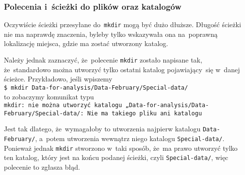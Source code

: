 \documentclass[10pt,t]{beamer}
\begin{document}
\begin{frame}
  \frametitle{Polecenia i~ścieżki do plików oraz katalogów}


  Oczywiście ścieżki przesyłane do~\texttt{mkdir} mogą być dużo dłuższe.
  Długość ścieżki nie ma naprawdę znaczenia, byleby tylko wskazywała ona
  na~poprawną lokalizację miejsca, gdzie ma zostać utworzony katalog.

  Należy jednak zaznaczyć, że~polecenie \texttt{mkdir} zostało napisane tak,
  że~standardowo można utworzyć tylko ostatni katalog pojawiający~się
  w~danej ścieżce. Przykładowo, jeśli wpiszemy \\
  \texttt{\$ mkdir Data-for-analysis/Data-February/Special-data/} \\
  to zobaczymy komunikat typu \\
  \texttt{mkdir: nie można utworzyć katalogu
    „Data-for-analysis/Data-February/Special-data/: Nie ma takiego
    pliku ani katalogu}

  Jest tak dlatego, że~wymagałoby to utworzenia najpierw katalogu
  \texttt{Data-February/}, a~potem utworzenia wewnątrz niego katalogu
  \texttt{Special-data/}. Ponieważ jednak \texttt{mkdir} stworzono w~taki
  sposób, że~ma prawo utworzyć tylko ten katalog, który jest na końcu
  podanej ścieżki, czyli \texttt{Special-data/}, więc polecenie to zgłasza
  błąd.


\end{frame}
\end{document}
